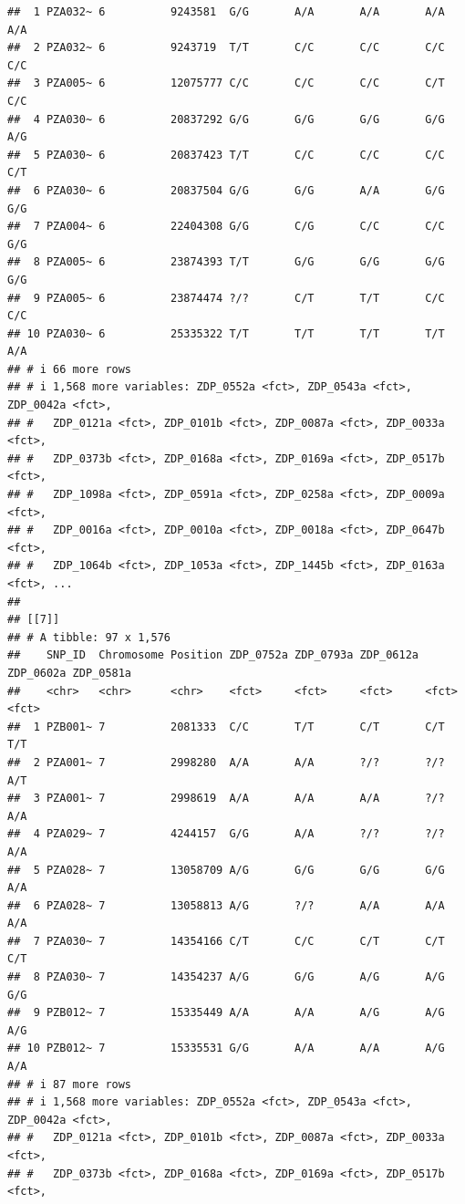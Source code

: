 \documentclass[
]{article}
\begin{document}
\begin{verbatim}
##  1 PZA032~ 6          9243581  G/G       A/A       A/A       A/A       A/A      
##  2 PZA032~ 6          9243719  T/T       C/C       C/C       C/C       C/C      
##  3 PZA005~ 6          12075777 C/C       C/C       C/C       C/T       C/C      
##  4 PZA030~ 6          20837292 G/G       G/G       G/G       G/G       A/G      
##  5 PZA030~ 6          20837423 T/T       C/C       C/C       C/C       C/T      
##  6 PZA030~ 6          20837504 G/G       G/G       A/A       G/G       G/G      
##  7 PZA004~ 6          22404308 G/G       C/G       C/C       C/C       G/G      
##  8 PZA005~ 6          23874393 T/T       G/G       G/G       G/G       G/G      
##  9 PZA005~ 6          23874474 ?/?       C/T       T/T       C/C       C/C      
## 10 PZA030~ 6          25335322 T/T       T/T       T/T       T/T       A/A      
## # i 66 more rows
## # i 1,568 more variables: ZDP_0552a <fct>, ZDP_0543a <fct>, ZDP_0042a <fct>,
## #   ZDP_0121a <fct>, ZDP_0101b <fct>, ZDP_0087a <fct>, ZDP_0033a <fct>,
## #   ZDP_0373b <fct>, ZDP_0168a <fct>, ZDP_0169a <fct>, ZDP_0517b <fct>,
## #   ZDP_1098a <fct>, ZDP_0591a <fct>, ZDP_0258a <fct>, ZDP_0009a <fct>,
## #   ZDP_0016a <fct>, ZDP_0010a <fct>, ZDP_0018a <fct>, ZDP_0647b <fct>,
## #   ZDP_1064b <fct>, ZDP_1053a <fct>, ZDP_1445b <fct>, ZDP_0163a <fct>, ...
## 
## [[7]]
## # A tibble: 97 x 1,576
##    SNP_ID  Chromosome Position ZDP_0752a ZDP_0793a ZDP_0612a ZDP_0602a ZDP_0581a
##    <chr>   <chr>      <chr>    <fct>     <fct>     <fct>     <fct>     <fct>    
##  1 PZB001~ 7          2081333  C/C       T/T       C/T       C/T       T/T      
##  2 PZA001~ 7          2998280  A/A       A/A       ?/?       ?/?       A/T      
##  3 PZA001~ 7          2998619  A/A       A/A       A/A       ?/?       A/A      
##  4 PZA029~ 7          4244157  G/G       A/A       ?/?       ?/?       A/A      
##  5 PZA028~ 7          13058709 A/G       G/G       G/G       G/G       A/A      
##  6 PZA028~ 7          13058813 A/G       ?/?       A/A       A/A       A/A      
##  7 PZA030~ 7          14354166 C/T       C/C       C/T       C/T       C/T      
##  8 PZA030~ 7          14354237 A/G       G/G       A/G       A/G       G/G      
##  9 PZB012~ 7          15335449 A/A       A/A       A/G       A/G       A/G      
## 10 PZB012~ 7          15335531 G/G       A/A       A/A       A/G       A/A      
## # i 87 more rows
## # i 1,568 more variables: ZDP_0552a <fct>, ZDP_0543a <fct>, ZDP_0042a <fct>,
## #   ZDP_0121a <fct>, ZDP_0101b <fct>, ZDP_0087a <fct>, ZDP_0033a <fct>,
## #   ZDP_0373b <fct>, ZDP_0168a <fct>, ZDP_0169a <fct>, ZDP_0517b <fct>,

\end{verbatim}
\end{document}
